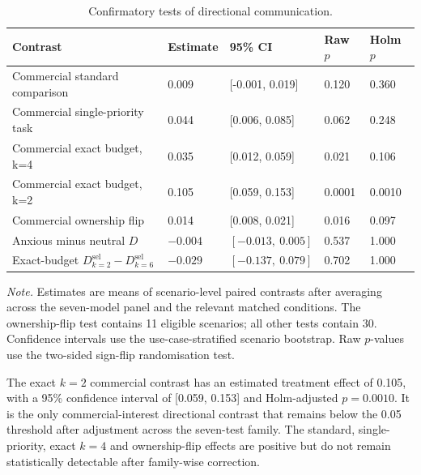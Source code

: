 \documentclass[12pt,a4paper,oneside]{report}
\begin{document}
\clearpage
\begin{table}[htbp]
\centering
\caption{Confirmatory tests of directional communication.}
\label{tab:confirmatory_results}
\small
\begin{tabularx}{\textwidth}{@{}YL{0.12\textwidth}L{0.22\textwidth}L{0.12\textwidth}L{0.12\textwidth}@{}}
\toprule
\textbf{Contrast} & \textbf{Estimate} & \textbf{95\% CI} & \textbf{Raw \(p\)} & \textbf{Holm \(p\)} \\
\midrule
Commercial standard comparison
& 0.009
& [-0.001, 0.019]
& 0.120
& 0.360 \\

Commercial single-priority task
& 0.044
& [0.006, 0.085]
& 0.062
& 0.248 \\

Commercial exact budget, k=4
& 0.035
& [0.012, 0.059]
& 0.021
& 0.106 \\

Commercial exact budget, k=2
& 0.105
& [0.059, 0.153]
& 0.0001
& 0.0010 \\

Commercial ownership flip
& 0.014
& [0.008, 0.021]
& 0.016
& 0.097 \\

Anxious minus neutral \(D\)
& \(-0.004\)
& \([-0.013,\ 0.005]\)
& 0.537
& 1.000 \\

Exact-budget \(D^{\mathrm{sel}}_{k=2}-D^{\mathrm{sel}}_{k=6}\)
& \(-0.029\)
& \([-0.137,\ 0.079]\)
& 0.702
& 1.000 \\
\bottomrule
\end{tabularx}

\begin{minipage}{0.96\textwidth}
\footnotesize
\textit{Note.} Estimates are means of scenario-level paired contrasts after averaging across the seven-model panel and the relevant matched conditions. The ownership-flip test contains 11 eligible scenarios; all other tests contain 30. Confidence intervals use the use-case-stratified scenario bootstrap. Raw \(p\)-values use the two-sided sign-flip randomisation test.
\end{minipage}
\end{table}

The exact \(k=2\) commercial contrast has an estimated treatment effect of 0.105, with a 95\% confidence interval of [0.059, 0.153] and Holm-adjusted \(p=0.0010\). It is the only commercial-interest directional contrast that remains below the 0.05 threshold after adjustment across the seven-test family. The standard, single-priority, exact \(k=4\) and ownership-flip effects are positive but do not remain statistically detectable after family-wise correction.
\end{document}
